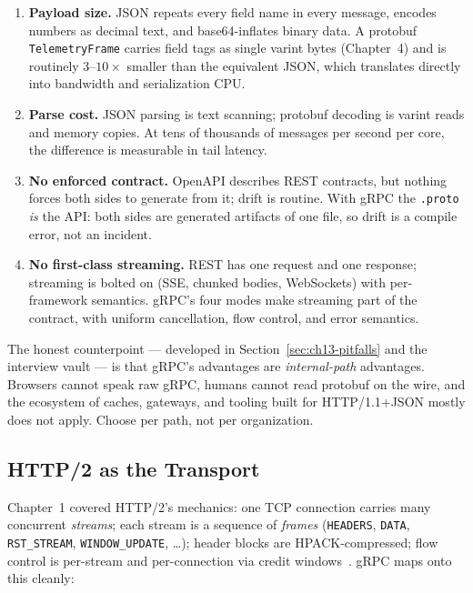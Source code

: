 \begin{enumerate}
  \item \textbf{Payload size.} JSON repeats every field name in every message,
        encodes numbers as decimal text, and base64-inflates binary data. A
        protobuf \texttt{TelemetryFrame} carries field tags as single varint
        bytes (Chapter~4) and is routinely $3$--$10\times$ smaller than the
        equivalent JSON, which translates directly into bandwidth and
        serialization CPU.
  \item \textbf{Parse cost.} JSON parsing is text scanning; protobuf decoding is
        varint reads and memory copies. At tens of thousands of messages per
        second per core, the difference is measurable in tail latency.
  \item \textbf{No enforced contract.} OpenAPI describes REST contracts, but
        nothing forces both sides to generate from it; drift is routine. With
        gRPC the \texttt{.proto} \emph{is} the API: both sides are generated
        artifacts of one file, so drift is a compile error, not an incident.
  \item \textbf{No first-class streaming.} REST has one request and one
        response; streaming is bolted on (SSE, chunked bodies, WebSockets) with
        per-framework semantics. gRPC's four modes make streaming part of the
        contract, with uniform cancellation, flow control, and error semantics.
\end{enumerate}

The honest counterpoint --- developed in Section~\ref{sec:ch13-pitfalls} and the
interview vault --- is that gRPC's advantages are \emph{internal-path}
advantages. Browsers cannot speak raw gRPC, humans cannot read protobuf on the
wire, and the ecosystem of caches, gateways, and tooling built for HTTP/1.1+JSON
mostly does not apply. Choose per path, not per organization.

\subsection{HTTP/2 as the Transport}
\label{subsec:ch13-http2}

Chapter~1 covered HTTP/2's mechanics: one TCP connection carries many
concurrent \emph{streams}; each stream is a sequence of \emph{frames}
(\texttt{HEADERS}, \texttt{DATA}, \texttt{RST\_STREAM}, \texttt{WINDOW\_UPDATE},
\ldots); header blocks are HPACK-compressed; flow control is per-stream and
per-connection via credit windows~\cite{rfc9113}. gRPC maps onto this cleanly:

